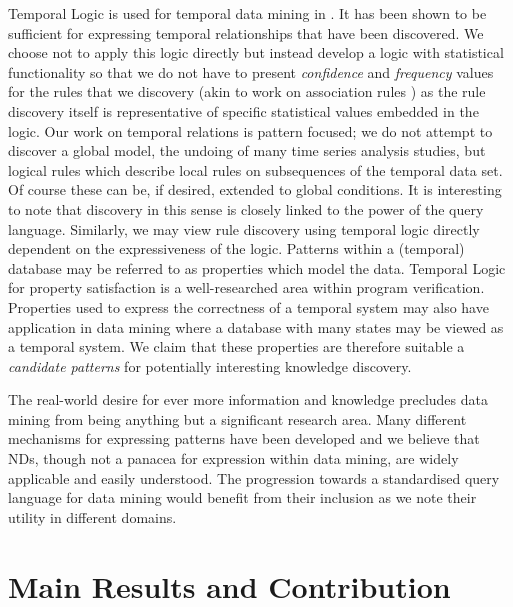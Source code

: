 Temporal Logic is used for temporal data mining in
\cite{pt96,bt98}. It has been shown to be sufficient for expressing
temporal relationships that have been discovered. We choose not to
apply this logic directly but instead develop a logic with statistical
functionality so that we do not have to present {\em confidence} and
{\em frequency} values for the rules that we discovery (akin to work
on association rules \cite{ais93,kmrtv94,hkmt95}) as the rule discovery
itself is representative of specific statistical values embedded in
the logic. Our work on temporal relations is pattern focused; we do
not attempt to discover a global model, the undoing of many time
series analysis studies, but logical rules which describe local rules
on subsequences of the temporal data set. Of course these can be, if
desired, extended to global conditions.
It is interesting to note that discovery in this
sense is closely linked to the power of the query language. Similarly,
we may view rule discovery using temporal logic directly dependent on
the expressiveness of the logic.
Patterns within a (temporal) database may be referred to as properties
which model the data. Temporal Logic for property satisfaction is a
well-researched area within program verification. Properties used to
express the correctness of a temporal system may also have application
in data mining where a database with many states may be viewed as a
temporal system. We claim that these properties are therefore suitable
a {\em candidate patterns} for potentially interesting knowledge
discovery. 

\medskip

The real-world desire for ever more information and knowledge
precludes data mining from being anything but a significant research
area. Many different mechanisms for expressing patterns have been
developed and we believe that NDs, though not a panacea for expression
within data mining, are widely applicable and easily understood. The
progression towards a standardised query language for data mining
would benefit from their inclusion as we note their utility in
different domains.

\section{Main Results and Contribution}\label{sec:int_contrib}


